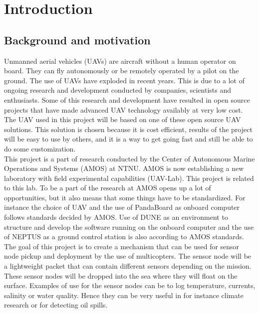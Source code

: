 \chapter{Introduction}
\section{Background and motivation}
Unmanned aerial vehicles (UAVs) are aircraft without a human operator on board. They can fly autonomously or be remotely operated by a pilot on the ground. The use of UAVs have exploded in recent years. This is due to a lot of ongoing research and development conducted by companies, scientists and enthusiasts. Some of this research and development have resulted in open source projects that have made advanced UAV technology availably at very low cost.\\
\newline
The UAV used in this project will be based on one of these open source UAV solutions. This solution is chosen because it is cost efficient, results of the project will be easy to use by others, and it is a way to get going fast and still be able to do some customization.\\
\newline
This project is a part of research conducted by the Center of Autonomous Marine Operations and Systems (AMOS) at NTNU. AMOS is now establishing a new laboratory with field experimental capabilities (UAV-Lab). This project is related to this lab. To be a part of the research at AMOS opens up a lot of opportunities, but it also means that some things have to be standardized. For instance the choice of UAV and the use of PandaBoard as onboard computer follows standards decided by AMOS. Use of DUNE as an environment to structure and develop the software running on the onboard computer and the use of NEPTUS as a ground control station is also according to AMOS standards.\\
\newline
The goal of this project is to create a mechanism that can be used for sensor node pickup and deployment by the use of multicopters. The sensor node will be a lightweight packet that can contain different sensors depending on the mission. These sensor nodes will be dropped into the sea where they will float on the surface. Examples of use for the sensor nodes can be to log temperature, currents, salinity or water quality. Hence they can be very useful in for instance climate research or for detecting oil spills.\\
